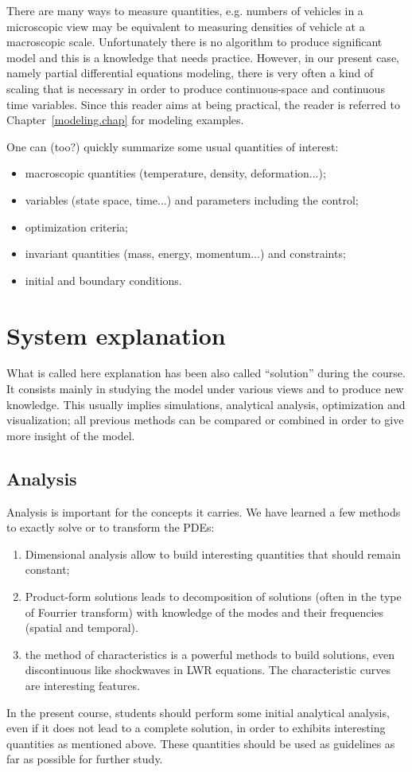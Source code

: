 There are many ways to measure quantities, e.g. numbers of vehicles in a microscopic view may be equivalent to measuring densities of vehicle at a macroscopic scale. Unfortunately there is no algorithm to produce significant model and this is a knowledge that needs practice. However, in our present case, namely partial differential equations modeling, there is very often a kind of scaling that is necessary in order to produce continuous-space and continuous time variables. Since this reader aims at being practical, the reader is referred to Chapter~\ref{modeling.chap} for modeling examples.

One can (too?) quickly summarize some usual quantities of interest:
\begin{itemize}
	\item macroscopic quantities (temperature, density, deformation...);
	\item variables (state space, time...) and parameters including the control;
	\item optimization criteria;
	\item invariant quantities (mass, energy, momentum...) and constraints;
	\item initial and boundary conditions.
\end{itemize}


\section{System explanation}
What is called here explanation has been also called ``solution'' during the course. It consists mainly in studying the model under various views and to produce new knowledge. This usually implies simulations, analytical analysis, optimization and visualization; all previous methods can be compared or combined in order to give more insight of the model.

\subsection{Analysis}\label{analysis.sec}
Analysis is important for the concepts it carries. We have learned a few methods to exactly solve or to transform the PDEs:
\begin{enumerate}
	\item Dimensional analysis allow to build interesting quantities that should remain constant;
	\item Product-form solutions leads to decomposition of solutions (often in the type of Fourrier transform) with knowledge of the modes and their frequencies (spatial and temporal).
	\item the method of characteristics is a powerful methods to build solutions, even discontinuous like shockwaves in LWR equations. The characteristic curves are interesting features.
\end{enumerate}
In the present course, students should perform some initial analytical analysis, even if it does not lead to a complete solution, in order to exhibits interesting quantities as mentioned above. These quantities should be used as guidelines as far as possible for further study.

